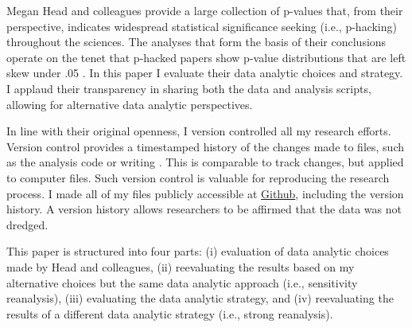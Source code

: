 Megan Head and colleagues provide a large collection of p-values that, from their perspective, indicates widespread statistical significance seeking (i.e., p-hacking) throughout the sciences. The analyses that form the basis of their conclusions operate on the tenet that p-hacked papers show p-value distributions that are left skew under .05 \cite{Simonsohn2014}. In this paper I evaluate their data analytic choices and strategy. I applaud their transparency in sharing both the data and analysis scripts, allowing for alternative data analytic perspectives.

In line with their original openness, I version controlled all my research efforts. Version control provides a timestamped history of the changes made to files, such as the analysis code or writing \cite{Ram2013}. This is comparable to track changes, but applied to computer files. Such version control is valuable for reproducing the research process. I made all of my files publicly accessible at \href{https://github.com/chartgerink/2015head}{Github}, including the version history. A version history allows researchers to be affirmed that the data was not dredged.

This paper is structured into four parts: (i) evaluation of data analytic choices made by Head and colleagues, (ii) reevaluating the results based on my alternative choices but the same data analytic approach (i.e., sensitivity reanalysis), (iii) evaluating the data analytic strategy, and (iv) reevaluating the results of a different data analytic strategy (i.e., strong reanalysis). 